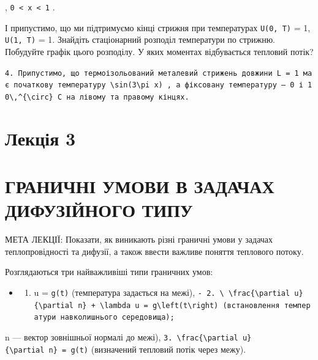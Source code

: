 \documentclass[
  ukrainian,
]{article}
\providecommand{\tightlist}{%
  \setlength{\itemsep}{0pt}\setlength{\parskip}{0pt}}
\begin{document}
, \texttt{0\ \textless{}\ x\ \textless{}\ 1} .

І припустимо, що ми підтримуємо кінці стрижня при температурах
\texttt{U(0,\ T)} = 1, \texttt{U(1,\ T)} = 1. Знайдіть стаціонарний
розподіл температури по стрижню. Побудуйте графік цього розподілу. У
яких моментах відбувається тепловий потік?

\texttt{4.\ Припустимо,\ що\ термоізольований\ металевий\ стрижень\ довжини\ L\ =\ 1\ має\ початкову\ температуру\ \textquotesingle{}\textbackslash{}sin(3\textbackslash{}pi\ x)\textquotesingle{}\ ,\ а\ фіксовану\ температуру\ —\ 0\ і\ \textquotesingle{}10\textbackslash{},\^{}\{\textbackslash{}circ\}\textquotesingle{}\ C\ на\ лівому\ та\ правому\ кінцях.}

\section{Лекція 3}\label{ux43bux435ux43aux446ux456ux44f-3}

\section{ГРАНИЧНІ УМОВИ В ЗАДАЧАХ ДИФУЗІЙНОГО
ТИПУ}\label{ux433ux440ux430ux43dux438ux447ux43dux456-ux443ux43cux43eux432ux438-ux432-ux437ux430ux434ux430ux447ux430ux445-ux434ux438ux444ux443ux437ux456ux439ux43dux43eux433ux43e-ux442ux438ux43fux443}

МЕТА ЛЕКЦІЇ: Показати, як виникають різні граничні умови у задачах
теплопровідності та дифузії, а також ввести важливе поняття теплового
потоку.

Розглядаються три найважливіші типи граничних умов:

\begin{itemize}
\tightlist
\item
  \begin{enumerate}
  \def\labelenumi{\arabic{enumi}.}
  \tightlist
  \item
    u = \texttt{g(t)} (температура задається на межі),
    \texttt{-\ \textquotesingle{}2.\ \textbackslash{}\ \textbackslash{}frac\{\textbackslash{}partial\ u\}\{\textbackslash{}partial\ n\}\ +\ \textbackslash{}lambda\ u\ =\ g\textbackslash{}left(t\textbackslash{}right)\textquotesingle{}\ (встановлення\ температури\ навколишнього\ середовища);}
  \end{enumerate}
\end{itemize}

n --- вектор зовнішньої нормалі до межі),
\texttt{3.\ \textbackslash{}frac\{\textbackslash{}partial\ u\}\{\textbackslash{}partial\ n\}\ =\ g(t)}
(визначений тепловий потік через межу).
\end{document}
